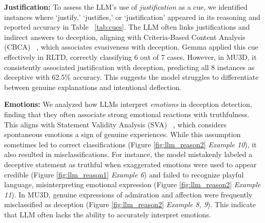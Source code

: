 \textbf{Justification:} To assess the LLM’s use of \textit{justification} as a cue, we identified instances where `justify,' `justifies,' or `justification' appeared in its reasoning and reported accuracy in Table ~\ref{tab:cues}. The LLM often links justifications and indirect answers to deception, aligning with Criteria-Based Content Analysis (CBCA) ~\cite{vrij2008detecting}, which associates evasiveness with deception. Gemma applied this cue effectively in RLTD, correctly classifying 6 out of 7 cases. However, in MU3D, it consistently associated justification with deception, predicting all 8 instances as deceptive with 62.5\% accuracy. This suggests the model struggles to differentiate between genuine explanations and intentional deflection.

\textbf{Emotions:} We analyzed how LLMs interpret \textit{emotions} in deception detection, finding that they often associate strong emotional reactions with truthfulness. This aligns with Statement Validity Analysis (SVA) ~\cite{vrij2008detecting}, which considers spontaneous emotions a sign of genuine experiences. While this assumption sometimes led to correct classifications (Figure \ref{fig:llm_reason2} \textit{Example 10}), it also resulted in misclassifications. For instance, the model mistakenly labeled a deceptive statement as truthful when exaggerated emotions were used to appear credible (Figure \ref{fig:llm_reason1} \textit{Example 6}) and failed to recognize playful language, misinterpreting emotional expression (Figure \ref{fig:llm_reason2} \textit{Example 11}). In MU3D, genuine expressions of admiration and affection were frequently misclassified as deception (Figure \ref{fig:llm_reason2} \textit{Example 8, 9}). This indicate that LLM often lacks the ability to accurately interpret emotions.



